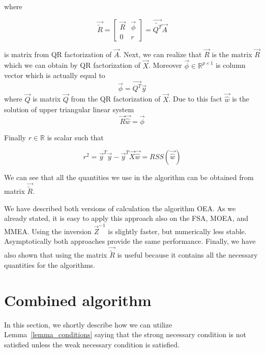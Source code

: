 where 

\begin{equation}
    \vec{\tilde{R}} = 
    \begin{bmatrix}
        \vec{R} & \vec{\phi} \\
     0 & r
    \end{bmatrix} 
    = \vec{\tilde{Q^T}}\vec{A}
\end{equation}

is matrix from QR factorization of $\vec{A}$. 
Next, we can realize that $\vec{R}$ is the matrix $\vec{R}$ which we can obtain by QR factorization of $\vec{X}$. 
Moreover $\vec{\phi} \in \mathbb{R}^{p \times 1}$ is column vector which is actually equal to
\begin{equation}
    \vec{\phi} =  \vec{Q^T}\vec{y}
\end{equation}
where $\vec{Q}$ is matrix $\vec{Q}$ from the QR factorization of $\vec{X}$.
Due to this fact $\vec{\hat{w}}$ is the solution of upper triangular linear system 
\begin{equation}
    \vec{R}\vec{\hat{w}} = \vec{\phi}
\end{equation}

Finally $r \in \mathbb{R}$ is scalar such that 

\begin{equation}
    r^2 = \vec{y}^T\vec{y} - \vec{y}^T\vec{X}\vec{\hat{w}} = RSS(\vec{\hat{w}})
\end{equation}

\begin{remark} \label{qnotrequiredspeedupremark}
    We can see that all the quantities we use in the algorithm can be obtained from matrix $\vec{\tilde{R}}$.
\end{remark}

We have described both versions of calculation the algorithm OEA. As we already stated, it is easy to apply this approach also on the FSA, MOEA, and MMEA. Using the inversion $\vec{Z}^{-1}$ is slightly faster, but numerically less stable. Asymptotically both approaches provide the same performance. Finally, we have also shown that using the matrix $\vec{\tilde{R}}$ is useful because it contains all the necessary quantities for the algorithms.









\section{Combined algorithm} \label{sectioncombined}
In this section, we shortly describe how we can utilize Lemma~\ref{lemma_conditions} saying that the strong necessary condition is not satisfied unless the weak necessary condition is satisfied.

